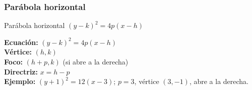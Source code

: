 \documentclass[12pt,a4paper]{article}
\begin{document}
\subsubsection{Parábola horizontal}
\begin{funcbox}{Parábola horizontal $(y-k)^2=4p(x-h)$}
\begin{minipage}[t]{0.55\textwidth}
    \textbf{Ecuación:} $(y-k)^2=4p(x-h)$\\
    \textbf{Vértice:} $(h,k)$\\
    \textbf{Foco:} $(h+p,k)$ (si abre a la derecha)\\
    \textbf{Directriz:} $x=h-p$\\
    \textbf{Ejemplo:} $(y+1)^2=12(x-3)$; $p=3$, vértice $(3,-1)$, abre a la derecha.
\end{minipage}\hfill
\begin{minipage}[t]{0.4\textwidth}
    \centering
\end{minipage}
\end{funcbox}
\end{document}
